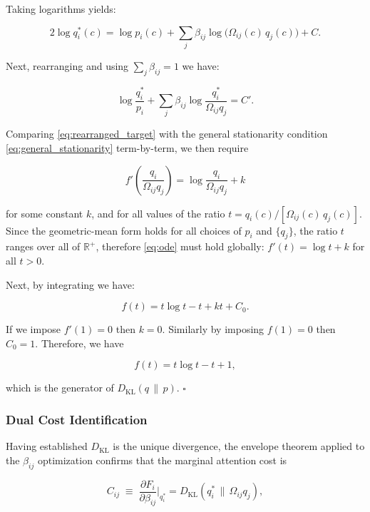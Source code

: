 \documentclass[twoside,11pt]{article}
\begin{document}
Taking logarithms yields:

\begin{equation}
2\log q_i^*(c) = \log p_i(c) + \sum_j\beta_{ij}\log\bigl(\Omega_{ij}(c)\,q_j(c)\bigr) + C.
\label{eq:log_target}
\end{equation}

Next, rearranging and using $\sum_j\beta_{ij}=1$ we have:

\begin{equation}
\log\frac{q_i^*}{p_i} + \sum_j\beta_{ij}\log\frac{q_i^*}{\Omega_{ij}q_j} = C'.
\label{eq:rearranged_target}
\end{equation}

Comparing \eqref{eq:rearranged_target} with the general stationarity condition \eqref{eq:general_stationarity} term-by-term, we then require

\begin{equation}
f'\!\!\left(\frac{q_i}{\Omega_{ij}q_j}\right) = \log\frac{q_i}{\Omega_{ij}q_j} + k
\label{eq:ode}
\end{equation}

for some constant $k$, and for all values of the ratio $t = q_i(c)/[\Omega_{ij}(c)\,q_j(c)]$.  Since the geometric-mean form holds for all choices of $p_i$ and $\{q_j\}$, the ratio $t$ ranges over all of $\mathbb{R}^+$, therefore \eqref{eq:ode} must hold globally: $f'(t)=\log t + k$ for all $t>0$.

Next, by integrating we have:

\[
f(t) = t\log t - t + kt + C_0.
\]

If we impose $f'(1)=0$ then $k=0$.  Similarly by imposing $f(1)=0$ then $C_0 = 1$.  Therefore, we have

\[
f(t) = t\log t - t + 1,
\]

which is the generator of $D_{\mathrm{KL}}(q\,\|\,p)$. \hfill $\square$

\subsubsection{Dual Cost Identification}
Having established $D_{\mathrm{KL}}$ is the unique divergence, the envelope theorem applied to the $\beta_{ij}$ optimization confirms that the marginal attention cost is

\begin{equation}
C_{ij} \;\equiv\; \frac{\partial F_i}{\partial\beta_{ij}}\bigg|_{q_i^*}
= D_{\mathrm{KL}}(q_i^*\,\|\,\Omega_{ij}q_j),
\end{equation}
\end{document}
